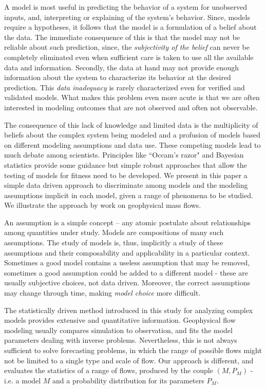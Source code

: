 \documentclass{article}
\begin{document}
A model is most useful in predicting the behavior of a system for unobserved inputs, and, interpreting or explaining of the system's behavior. Since, models require a hypotheses, it follows  that the model is a formulation of a belief about the data. The immediate consequence of this is that the model may not be reliable about such prediction, since, the {\it subjectivity of the belief} can never be completely eliminated \citep{Kennedy2001, Higdon2004} even when sufficient care is taken to use all the available data and information. Secondly, the data at hand may not provide enough information about the system to characterize its behavior at the desired prediction. This {\it data inadequacy} is rarely characterized even for verified and validated models. What makes this problem even more acute is that we are often interested in modeling outcomes that are not observed and often not observable.

The consequence of this lack of knowledge and limited data is the multiplicity of beliefs about the complex system being modeled and a profusion of models based on different modeling assumptions and data use. These competing models lead to much debate among scientists. Principles like ``Occam's razor" and Bayesian statistics \citep{Farrell2015} provide some guidance but simple robust approaches that allow the testing of models for fitness need to be developed. We present in this paper a simple data driven approach to discriminate among models and the modeling assumptions implicit in each model, given a range of phenomena to be studied. We illustrate the approach by work on geophysical mass flows.


An assumption is a simple concept -- any atomic postulate about relationships among quantities under study. Models are compositions of many such assumptions. The study of models is, thus, implicitly a study of these assumptions and their composability and applicability in a particular context. Sometimes a good model contains a useless assumption that may be removed, sometimes a good assumption could be added to a different model - these are usually subjective choices, not data driven. Moreover, the correct assumptions may change through time, making {\em model choice} more difficult.


The statistically driven method introduced in this study for analyzing complex models provides extensive and quantitative information. Geophysical flow modeling usually compares simulation to observation, and fits the model parameters dealing with inverse problems. Nevertheless, this is not always sufficient to solve forecasting problems, in which the range of possible flows might not be limited to a single type and scale of flow. Our approach is different, and evaluates the statistics of a range of flows, produced by the couple $\left(M, P_M\right)$ - i.e. a model $M$ and a probability distribution for its parameters $P_M$.
\end{document}
